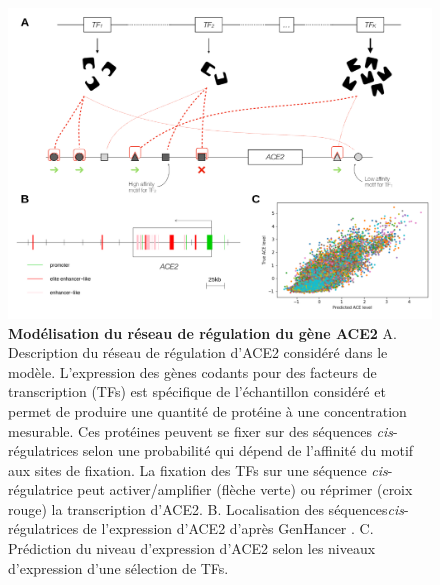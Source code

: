 \begin{figure}[h]
    \centering
    \includegraphics[width=1\textwidth, page=1] {figures/annexes/ace2-fig1.png}
    \caption[Modélisation du réseau de régulation du gène ACE2.]{
    \textbf{Modélisation du réseau de régulation du gène ACE2}
    A. Description du réseau de régulation d'ACE2 considéré dans le modèle. L'expression des gènes codants pour des facteurs de transcription (TFs) est spécifique de l'échantillon considéré et permet de produire une quantité de protéine à une concentration mesurable. Ces protéines peuvent se fixer sur des séquences \textit{cis}-régulatrices selon une probabilité qui dépend de l'affinité du motif aux sites de fixation. La fixation des TFs sur une séquence \textit{cis}-régulatrice peut activer/amplifier (flèche verte) ou réprimer (croix rouge) la transcription d'ACE2.
    B. Localisation des séquences\textit{cis}-régulatrices de l'expression d'ACE2 d'après GenHancer \citep{fishilevich_genehancer_2017}.
    C. Prédiction du niveau d'expression d'ACE2 selon les niveaux d'expression d'une sélection de TFs. \\
    }
    \label{fig:ace2}
\end{figure} 

